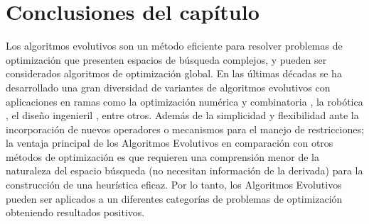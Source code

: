 \section{Conclusiones del capítulo}
Los algoritmos evolutivos son un método eficiente para resolver problemas de optimización que presenten espacios de búsqueda complejos, y  pueden ser considerados algoritmos de optimización global.  En las últimas décadas se ha desarrollado una gran diversidad de variantes de algoritmos evolutivos con aplicaciones en ramas como la optimización numérica y combinatoria  \cite{wright1991genetic} \cite{han2000genetic}, la robótica \cite{nolfi2016evolutionary} \cite{wang2016double},  el diseño ingenieril \cite{yildiz2013comparison}\cite{dasgupta2013evolutionary}, entre otros.
Además de la simplicidad y flexibilidad ante la incorporación de nuevos operadores o mecanismos para el manejo de restricciones; la ventaja principal de los Algoritmos Evolutivos  en comparación con otros métodos de optimización es que requieren una comprensión menor de la naturaleza del espacio búsqueda (no necesitan información de la derivada) para la construcción de una heurística eficaz. Por lo tanto, los Algoritmos Evolutivos pueden ser aplicados a un diferentes categorías de problemas de optimización obteniendo resultados positivos.




